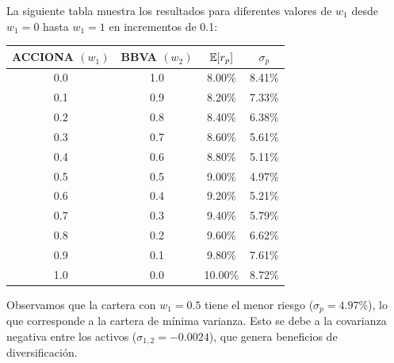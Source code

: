 \begin{ejemplo}
La siguiente tabla muestra los resultados para diferentes valores de $w_1$ desde $w_1 = 0$ hasta $w_1 = 1$ en incrementos de 0.1:

\begin{center}
\begin{tabular}{cccc}
\toprule
ACCIONA $(w_1)$ & BBVA $(w_2)$ & $\mathbb{E}[r_p]$ & $\sigma_p$ \\
\midrule
0.0 & 1.0 & 8.00\% & 8.41\% \\
0.1 & 0.9 & 8.20\% & 7.33\% \\
0.2 & 0.8 & 8.40\% & 6.38\% \\
0.3 & 0.7 & 8.60\% & 5.61\% \\
0.4 & 0.6 & 8.80\% & 5.11\% \\
0.5 & 0.5 & 9.00\% & 4.97\% \\
0.6 & 0.4 & 9.20\% & 5.21\% \\
0.7 & 0.3 & 9.40\% & 5.79\% \\
0.8 & 0.2 & 9.60\% & 6.62\% \\
0.9 & 0.1 & 9.80\% & 7.61\% \\
1.0 & 0.0 & 10.00\% & 8.72\% \\
\bottomrule
\end{tabular}
\end{center}

Observamos que la cartera con $w_1 = 0.5$ tiene el menor riesgo ($\sigma_p = 4.97\%$), lo que corresponde a la cartera de mínima varianza. Esto se debe a la covarianza negativa entre los activos ($\sigma_{1,2} = -0.0024$), que genera beneficios de diversificación.
\end{ejemplo}

